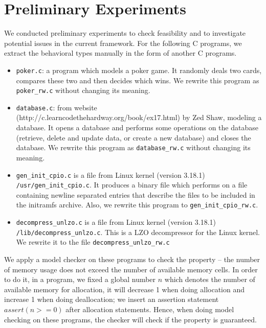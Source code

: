 \section{Preliminary Experiments}
\label{sec:experiment}


We conducted preliminary experiments to check feasibility and to
investigate potential issues in the current framework.  For the
following C programs, we extract the behavioral types manually in the
form of another C programs.
\begin{itemize}

\item \texttt{poker.c}: a program which models a poker game.  It
  randomly deals two cards, compares these two and then decides which
  wins.  We rewrite this program as \texttt{poker\_rw.c} without
  changing its meaning.
\item \texttt{database.c}: from website
  (http://c.learncodethehardway.org/book/ex17.html) by Zed Shaw,
  modeling a database.  It opens a database and performs some
  operations on the database (retrieve, delete and update data, or
  create a new database) and closes the database.  We rewrite this
  program as \texttt{database\_rw.c} without changing its meaning.
\item \texttt{gen\_init\_cpio.c} is a file from Linux kernel (version 3.18.1)
  \texttt{/usr/gen\_init\_cpio.c}.  It produces a binary file which
  performs on a file containing newline separated entries that
  describe the files to be included in the initramfs archive.  Also, we
  rewrite this program to \texttt{gen\_init\_cpio\_rw.c}.
  \item \texttt{decompress\_unlzo.c} is a file from Linux kernel (version 3.18.1)
    \texttt{/lib/decompress\_unlzo.c}.  This is a LZO decompressor for
    the Linux kernel.  We rewrite it to the file \texttt{decompress\_unlzo\_rw.c}
\end{itemize}

We apply a model checker on these programs to check the property --
the number of memory usage does not exceed the number of available
memory cells.  In order to do it, in a program, we fixed a global
number $n$ which denotes the number of available memory for
allocation, it will decrease 1 when doing allocation and increase 1
when doing deallocation; we insert an assertion statement $assert(n >=
0)$ after allocation statements. Hence, when doing model checking on
these programs, the checker will check if the property is guaranteed.

